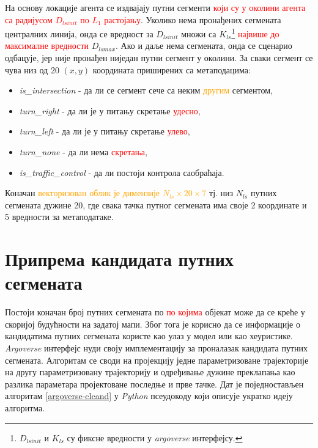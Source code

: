 \documentclass[11pt,oneside]{memoir}
\begin{document}
На основу локације агента се издвајају путни сегменти \textcolor{red}{који су у околини агента са радијусом $D_{lsinit}$ по $L_1$ растојању}. 
Уколико нема пронађених сегмената централних линија, онда се вредност за $D_{lsinit}$ множи са $K_{ls}$\footnote{$D_{lsinit}$ и $K_{ls}$ су фиксне вредности
у \textit{argoverse} интерфејсу.} \textcolor{red}{највише до максималне вредности} $D_{lsmax}$. Ако и даље нема сегмената, 
онда се сценарио одбацује, јер није пронађен ниједан путни сегмент у околини. 
За сваки сегмент се чува низ од 20 $(x, y)$ координата приширених са метаподацима:
\begin{itemize} 
  \item \textit{is\_intersection} - да ли се сегмент сече са неким \textcolor{orange}{другим} сегментом,
  \item \textit{turn\_right} - да ли је у питању скретање \textcolor{red}{удесно}, 
  \item \textit{turn\_left} - да ли је у питању скретање \textcolor{red}{улево}, 
  \item \textit{turn\_none} - да ли нема \textcolor{red}{скретања}, 
  \item \textit{is\_traffic\_control} - да ли постоји контрола саобраћаја. 
\end{itemize}
Коначан \textcolor{orange}{векторизован облик је димензије $N_{ls}\times 20\times 7$} тј. низ $N_{ls}$ путних сегмената дужине 20, где свака тачка путног сегмената има своје 2 координате
и 5 вредности за метаподатаке. 

\section{Припрема кандидата путних сегмената}

Постоји коначан број путних сегмената по \textcolor{red}{по којима}
објекат може да се креће у скоријој будућности на задатој мапи. Због тога је корисно да се информације о кандидатима путних сегмената
користе као улаз у модел или као хеуристике.
\textit{Argoverse} интерфејс нуди своју имплементацију
за проналазак кандидата путних сегмената. Алгоритам се своди на пројекцију једне параметризоване трајекторије на другу параметризовану трајекторију и 
одређивање дужине преклапања као разлика параметара пројектоване последње и прве тачке. Дат је поједностављен алгоритам \ref{argoverse-clcand} у \textit{Python} 
псеудокоду који описује укратко идеју алгоритма.
\end{document}
